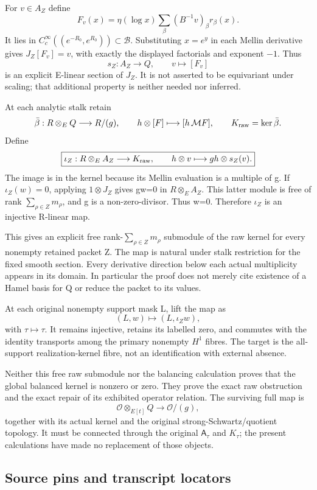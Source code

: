 For \(v\in A_Z\) define \[
F_v(x)=\eta(\log x)\sum_\beta(B^{-1}v)_\beta r_\beta(x).
\] It lies in \(C_c^\infty((e^{-R_0},e^{R_0}))\subset\mathscr B\). Substituting \(x=e^y\) in each Mellin derivative gives \(J_Z[F_v]=v\), with exactly the displayed factorials and exponent \(-1\). Thus \[
s_Z:A_Z\longrightarrow Q,\qquad v\longmapsto[F_v]
\] is an explicit E-linear section of \(J_Z\). It is not asserted to be equivariant under scaling; that additional property is neither needed nor inferred.

At each analytic stalk retain \[
\bar\beta:R\otimes_E Q\longrightarrow R/(g),\qquad
h\otimes[F]\longmapsto[h\,\mathcal MF],
\qquad K_{\rm raw}=\ker\bar\beta.
\] Define \[
\boxed{\iota_Z:R\otimes_E A_Z\longrightarrow K_{\rm raw},\qquad
h\otimes v\longmapsto gh\otimes s_Z(v).}
\] The image is in the kernel because its Mellin evaluation is a multiple of g. If \(\iota_Z(w)=0\), applying \(1\otimes J_Z\) gives gw=0 in \(R\otimes_E A_Z\). This latter module is free of rank \(\sum_{\rho\in Z}m_\rho\), and g is a non-zero-divisor. Thus w=0. Therefore \(\iota_Z\) is an injective R-linear map.

This gives an explicit free rank-\(\sum_{\rho\in Z}m_\rho\) submodule of the raw kernel for every nonempty retained packet Z. The map is natural under stalk restriction for the fixed smooth section. Every derivative direction below each actual multiplicity appears in its domain. In particular the proof does not merely cite existence of a Hamel basis for Q or reduce the packet to its values.

At each original nonempty support mask L, lift the map as \[
(L,w)\longmapsto(L,\iota_Zw),
\] with \(\tau\mapsto\tau\). It remains injective, retains its labelled zero, and commutes with the identity transports among the primary nonempty \(H^1\) fibres. The target is the all-support realization-kernel fibre, not an identification with external absence.

Neither this free raw submodule nor the balancing calculation proves that the global balanced kernel is nonzero or zero. They prove the exact raw obstruction and the exact repair of its exhibited operator relation. The surviving full map is \[
\mathcal O\otimes_{E[t]}Q\longrightarrow\mathcal O/(g),
\] together with its actual kernel and the original strong-Schwartz/quotient topology. It must be connected through the original \(\mathsf A_\tau\) and \(K_\tau\); the present calculations have made no replacement of those objects.

\subsection{Source pins and transcript locators}\label{TranscriptStage:proof06:typed-mellin:source-pins-and-transcript-locators}

